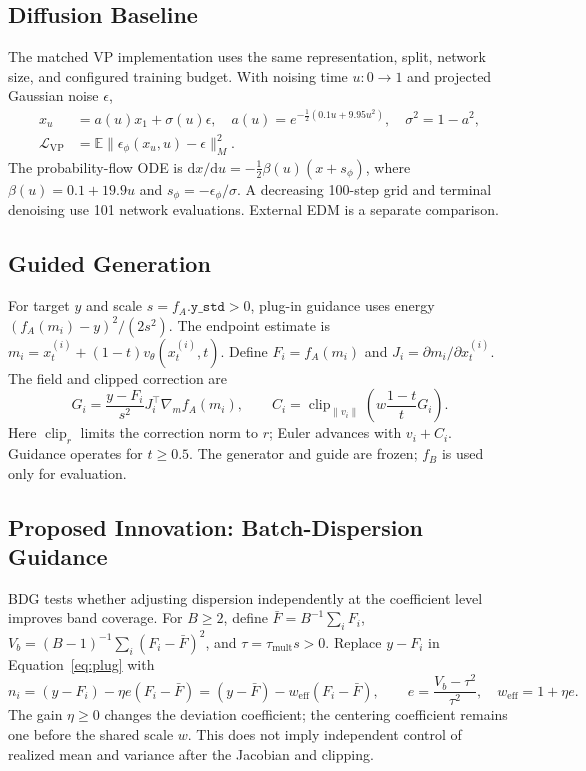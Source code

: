\documentclass{article}
\newcommand{\Fbar}{\bar F}
\newcommand{\Vb}{V_b}
\newcommand{\weff}{w_{\mathrm{eff}}}
\begin{document}
\subsection{Diffusion Baseline}\label{sec:diff}
The matched VP implementation uses the same representation, split, network size, and configured training budget. With noising time $u:0\to1$ and projected Gaussian noise $\epsilon$,
\begin{equation}
\begin{aligned}
x_u&=a(u)x_1+\sigma(u)\epsilon,\quad a(u)=e^{-\frac12(0.1u+9.95u^2)},\quad \sigma^2=1-a^2,\\
\mathcal L_{\mathrm{VP}}&=\mathbb E\|\epsilon_\phi(x_u,u)-\epsilon\|_M^2.
\end{aligned}
\label{eq:vp}
\end{equation}
The probability-flow ODE is $\mathrm dx/\mathrm du=-\tfrac12\beta(u)(x+s_\phi)$, where $\beta(u)=0.1+19.9u$ and $s_\phi=-\epsilon_\phi/\sigma$. A decreasing 100-step grid and terminal denoising use 101 network evaluations. External EDM is a separate comparison.

\subsection{Guided Generation}\label{sec:guidance}
For target $y$ and scale $s=f_A.\texttt{y\_std}>0$, plug-in guidance uses energy $(f_A(m_i)-y)^2/(2s^2)$. The endpoint estimate is $m_i=x_t^{(i)}+(1-t)v_\theta(x_t^{(i)},t)$. Define $F_i=f_A(m_i)$ and $J_i=\partial m_i/\partial x_t^{(i)}$. The field and clipped correction are
\begin{equation}
G_i=\frac{y-F_i}{s^2}J_i^\top\nabla_m f_A(m_i),\qquad
C_i=\operatorname{clip}_{\|v_i\|}\!\left(w\frac{1-t}{t}G_i\right).
\label{eq:plug}
\end{equation}
Here $\operatorname{clip}_r$ limits the correction norm to $r$; Euler advances with $v_i+C_i$. Guidance operates for $t\ge0.5$. The generator and guide are frozen; $f_B$ is used only for evaluation.

\subsection{Proposed Innovation: Batch-Dispersion Guidance}\label{sec:bdg}
BDG tests whether adjusting dispersion independently at the coefficient level improves band coverage. For $B\ge2$, define $\Fbar=B^{-1}\sum_iF_i$, $\Vb=(B-1)^{-1}\sum_i(F_i-\Fbar)^2$, and $\tau=\tau_{\mathrm{mult}}s>0$. Replace $y-F_i$ in Equation~\eqref{eq:plug} with
\begin{equation}
n_i=(y-F_i)-\eta e(F_i-\Fbar)=(y-\Fbar)-\weff(F_i-\Fbar),\qquad
e=\frac{\Vb-\tau^2}{\tau^2},\quad \weff=1+\eta e.
\label{eq:bdg}
\end{equation}
The gain $\eta\ge0$ changes the deviation coefficient; the centering coefficient remains one before the shared scale $w$. This does not imply independent control of realized mean and variance after the Jacobian and clipping.
\end{document}
